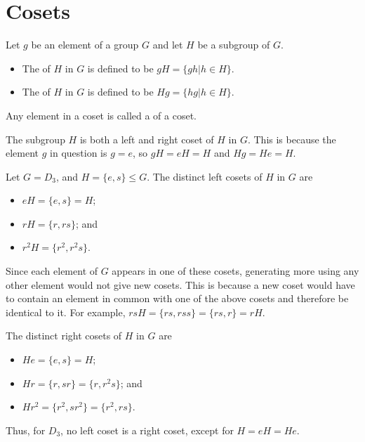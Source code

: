 \section{Cosets}
\begin{definition}
    Let $g$ be an element of a group $G$ and let $H$ be a subgroup of $G$.
    \begin{itemize}
        \item The  of $H$ in $G$ is defined to be $gH = \{gh \vert h \in H\}$.
        \item The  of $H$ in $G$ is defined to be $Hg = \{hg \vert h \in H\}$.
    \end{itemize}
    Any element in a coset is called a  of a coset.
\end{definition}
\begin{remark}
    The subgroup $H$ is both a left and right coset of $H$ in $G$. This is because the element $g$ in question is $g = e$, so $gH = eH = H$ and $Hg = He = H$.
\end{remark}

\begin{example}
    Let $G = D_3$, and $H = \{e, s\} \leq G$. The distinct left cosets of $H$ in $G$ are
    \begin{itemize}
        \item $eH = \{e, s\} = H$;
        \item $rH = \{r, rs\}$; and
        \item $r^2H = \{r^2, r^2s\}$.
    \end{itemize}
    Since each element of $G$ appears in one of these cosets, generating more using any other element would not give new cosets. This is because a new coset would have to contain an element in common with one of the above cosets and therefore be identical to it. For example, $rsH = \{rs, rss\} = \{rs, r\} = rH$.

    The distinct right cosets of $H$ in $G$ are
    \begin{itemize}
        \item $He = \{e, s\} = H$;
        \item $Hr = \{r, sr\} = \{r, r^2s\}$; and
        \item $Hr^2 = \{r^2, sr^2\} = \{r^2, rs\}$.
    \end{itemize}
    Thus, for $D_3$, no left coset is a right coset, except for $H = eH = He$.
\end{example}

